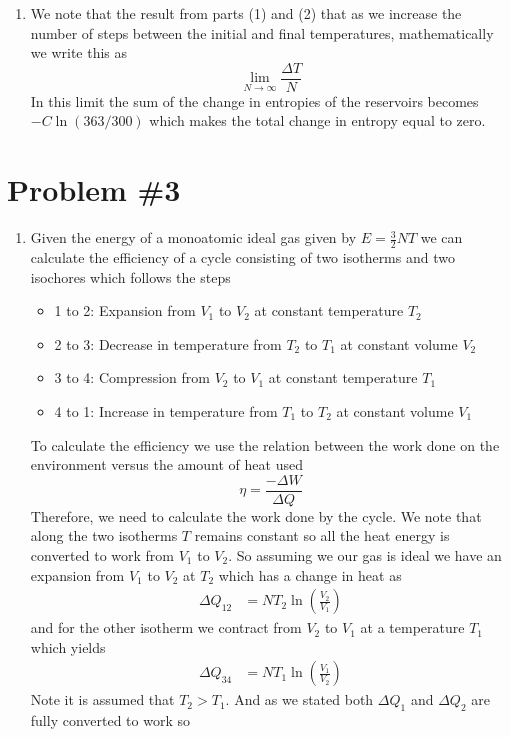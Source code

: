 \documentclass[11pt]{article}
\numberwithin{equation}{section}
\begin{document}
\begin{enumerate}[(1)]
\item We note that the result from parts (1) and (2) that as we increase the number of steps
between the initial and final temperatures, mathematically we write this as
$$\lim_{N\rightarrow\infty}\frac{\Delta{T}}{N}$$
In this limit the sum of the change in entropies of the reservoirs becomes $-C\ln(363/300)$ 
which makes the total change in entropy equal to zero.
\end{enumerate}

\pagebreak

\section{Problem \#3}
\begin{enumerate}[(1)]
\item Given the energy of a monoatomic ideal gas given by $E=\frac{3}{2}NT$ we can calculate
the efficiency of a cycle consisting of two isotherms and two isochores which follows the 
steps
\begin{itemize}
\item 1 to 2: Expansion from $V_1$ to $V_2$ at constant temperature $T_2$
\item 2 to 3: Decrease in temperature from $T_2$ to $T_1$ at constant volume $V_2$
\item 3 to 4: Compression from $V_2$ to $V_1$ at constant temperature $T_1$
\item 4 to 1: Increase in temperature from $T_1$ to $T_2$ at constant volume $V_1$
\end{itemize}
To calculate the
efficiency we use the relation between the work done on the environment versus the amount of
heat used
$$\eta = \frac{-\Delta{W}}{\Delta{Q}}$$
Therefore, we need to calculate the work done by the cycle. We note that along the two 
isotherms $T$ remains constant so all the heat energy is converted to work from $V_1$ to 
$V_2$. So assuming we our gas is ideal we have an expansion from $V_1$ to $V_2$ at $T_2$ 
which has a change in heat as
\begin{align*}
\Delta{Q}_{12} &= NT_2\ln\left(\frac{V_2}{V_1}\right)
\end{align*}
and for the other isotherm we contract from $V_2$ to $V_1$ at a temperature $T_1$ which yields
\begin{align*}
\Delta{Q}_{34} &= NT_1\ln\left(\frac{V_1}{V_2}\right)
\end{align*}
Note it is assumed that $T_2>T_1$. And as we stated both $\Delta{Q}_1$ and $\Delta{Q}_2$ are
fully converted to work so

\end{enumerate}
\end{document}
